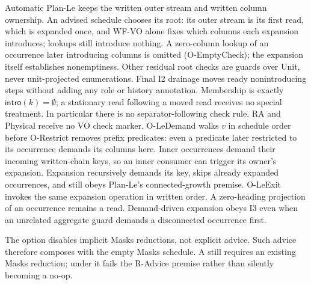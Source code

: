 Automatic Plan-Le keeps the written outer stream and written column
ownership. An advised schedule chooses its root: its outer stream is its
first read, which is expanded once, and WF-VO alone fixes which columns each
expansion introduces; lookups still introduce nothing. A zero-column lookup
of an occurrence later introducing columns is omitted (O-EmptyCheck); the
expansion itself establishes nonemptiness. Other residual root checks are
guards over Unit, never unit-projected enumerations. Final I2 drainage moves
ready nonintroducing steps without adding any role or history annotation.
Membership is exactly $\mathsf{intro}(k)=\emptyset$; a stationary read
following a moved read receives no special treatment. In particular there is
no separator-following check rule. RA and Physical receive no VO check marker.
O-LeDemand walks $v$ in schedule order before O-Restrict removes prefix
predicates: even a predicate later restricted to its occurrence demands its
columns here. Inner occurrences demand their incoming written-chain keys,
so an inner consumer can trigger its owner's expansion. Expansion recursively
demands its key, skips already expanded occurrences, and still obeys Plan-Le's
connected-growth premise. O-LeExit invokes the same expansion operation in
written order. A zero-heading projection of an occurrence remains a read.
Demand-driven expansion obeys I3 even when an unrelated aggregate guard
demands a disconnected occurrence first.

The  option disables implicit Masks reductions, not explicit
 advice. Such advice therefore composes with the empty
Masks schedule. A  still requires an existing Masks
reduction; under  it fails the R-Advice premise rather than
silently becoming a no-op.

